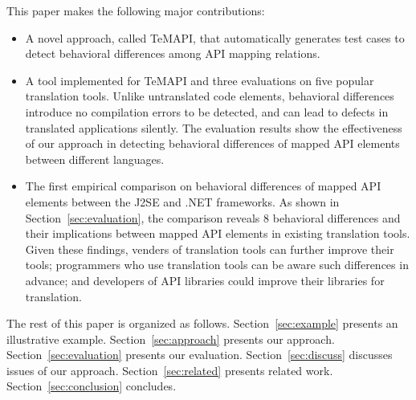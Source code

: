 This paper makes the following major contributions:

\begin{itemize}\vspace*{-1ex}
\item A novel approach, called TeMAPI, that automatically generates test cases to detect behavioral differences among API mapping relations. %
\item A tool implemented for TeMAPI and three evaluations on five popular translation tools. Unlike untranslated code elements, behavioral differences introduce no compilation errors to be detected, and can lead to defects in translated applications silently. The evaluation results show the effectiveness of our approach in detecting behavioral differences of mapped API elements between different languages.
\item The first empirical comparison on behavioral differences of mapped API elements between the J2SE and .NET frameworks. As shown in Section~\ref{sec:evaluation}, the comparison reveals 8 behavioral differences and their implications between mapped API elements in existing translation tools. Given these findings, venders of translation tools can further improve their tools; programmers who use translation tools can be aware such differences in advance; and developers of API libraries could improve their libraries for translation.
\end{itemize}\vspace*{-1ex}

The rest of this paper is organized as follows.
Section~\ref{sec:example} presents an illustrative example.
Section~\ref{sec:approach} presents our approach.
Section~\ref{sec:evaluation} presents our evaluation.
Section~\ref{sec:discuss} discusses issues of our approach.
Section~\ref{sec:related} presents related work.
Section~\ref{sec:conclusion} concludes.



